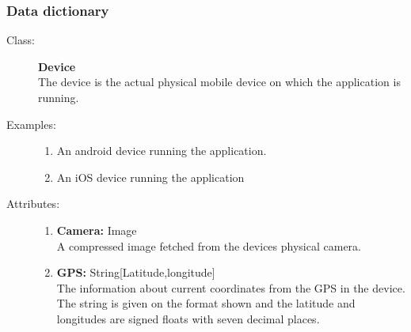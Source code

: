 \documentclass[10pt,a4paper]{article}
\begin{document}
\subsubsection{Data dictionary}

%
%
%

\begin{description}
\item[Class:] \textbf{Device} \hfill \\
The device is the actual physical mobile device on which the application is running.

\item[Examples:] \hfill
\begin{enumerate}
\item An android device running the application.
\item An iOS device running the application
\end{enumerate}

\item[Attributes:] \hfill
\begin{enumerate}
\item \textbf{Camera:} Image \hfill \\A compressed image fetched from the devices physical camera.
\item \textbf{GPS:} String[Latitude,longitude] \hfill \\The information about current coordinates from the GPS in the device. The string is given on the format shown and the latitude and longitudes are signed floats with seven decimal places.
\end{enumerate}
\end{description}
\end{document}
